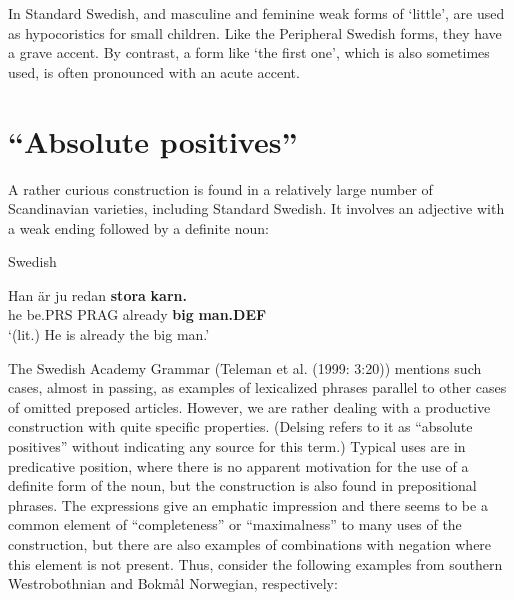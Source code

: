 In Standard Swedish,  and  masculine and feminine weak forms of  ‘little’, are used as hypocoristics for small children. Like the Peripheral Swedish forms, they have a grave accent. By contrast, a form like  ‘the first one’, which is also sometimes used, is often pronounced with an acute accent. 


\section{“Absolute positives”}
\label{bkm:Ref141250984}
A rather curious construction is found in a relatively large number of Scandinavian varieties, including Standard Swedish. It involves an adjective with a weak ending followed by a definite noun:


\item 

Swedish



 \ea\label{}
\gll Han  är  ju  redan  \textbf{stora}\textbf{  karn.}\\


he  be.PRS  PRAG  already  \textbf{big} \textbf{man.DEF}\\

\glt ‘(lit.) He is already the big man.’

\z

The Swedish Academy Grammar (Teleman et al. (1999: 3:20)) mentions such cases, almost in passing, as examples of lexicalized phrases parallel to other cases of omitted preposed articles. However, we are rather dealing with a productive construction with quite specific properties. (Delsing refers to it as “absolute positives” without indicating any source for this term.) Typical uses are in predicative position, where there is no apparent motivation for the use of a definite form of the noun, but the construction is also found in prepositional phrases. The expressions give an emphatic impression and there seems to be a common element of “completeness” or “maximalness” to many uses of the construction, but there are also examples of combinations with negation where this element is not present. Thus, consider the following examples from southern Westrobothnian and Bokmål Norwegian, respectively: 

